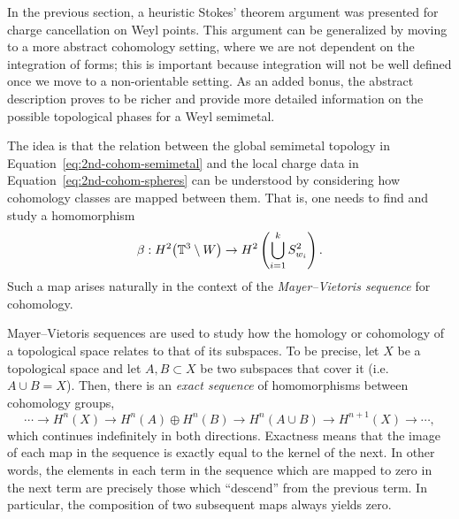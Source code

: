 In the previous section, a heuristic Stokes' theorem argument was presented for charge cancellation on Weyl points. This argument can be generalized by moving to a more abstract cohomology setting, where we are not dependent on the integration of forms; this is important because integration will not be well defined once we move to a non-orientable setting. As an added bonus, the abstract description proves to be richer and provide more detailed information on the possible topological phases for a Weyl semimetal.

The idea is that the relation between the global semimetal topology in Equation~\eqref{eq:2nd-cohom-semimetal} and the local charge data in Equation~\eqref{eq:2nd-cohom-spheres} can be understood by considering how cohomology classes are mapped between them. That is, one needs to find and study a homomorphism
\begin{equation*}
	\beta: H^2\big(\mathbb{T}^3\setminus W\big) \to H^2\left(\bigcup_{i=1}^k S_{w_i}^2\right).
\end{equation*}
Such a map arises naturally in the context of the \emph{Mayer--Vietoris sequence} for cohomology.

Mayer--Vietoris sequences are used to study how the homology or cohomology of a topological space relates to that of its subspaces. To be precise, let $X$ be a topological space and let $A,B\subset X$ be two subspaces that cover it (i.e.\ $A\cup B = X$). Then, there is an \emph{exact sequence} of homomorphisms between cohomology groups,
\begin{equation*}
	\cdots \to H^n(X) \to H^n(A)\oplus H^n(B) \to H^n(A\cup B) \to H^{n+1}(X) \to \cdots,
\end{equation*}
which continues indefinitely %
in both directions. Exactness means that the image of each map in the sequence is exactly equal to the kernel of the next. %
In other words, the elements in each term in the sequence which are mapped to zero in the next term are precisely those which ``descend'' from the previous term. In particular, the composition of two subsequent maps always yields zero.


